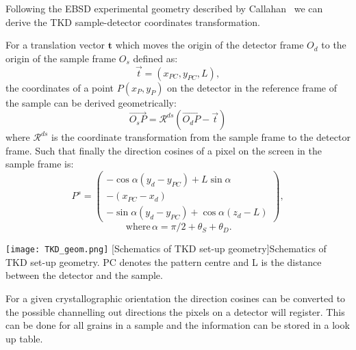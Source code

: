 Following the EBSD experimental geometry described by Callahan~\cite{degraef2013e} we can derive the TKD sample-detector coordinates transformation.


\noindent \begin{minipage}{0.5\textwidth}
\vspace{0.5cm}
For a translation vector $\textbf{t}$ which moves the origin of the detector frame $O_d$ to the origin of the sample frame $O_s$ defined as:
\begin{equation*}
    \vec{t}=(x_{PC}, y_{PC}, L),
\end{equation*}
the coordinates of a point $P(x_P, y_P)$ on the detector in the reference frame of the sample can be derived geometrically:
\begin{equation*}
   \vec{O_sP} = \mathcal{R}^{ds}(\vec{O_dP} -\vec{t})
\end{equation*}
where   $\mathcal{R}^{ds}$    is the coordinate transformation from the sample frame to the detector frame. Such that finally the direction cosines of a pixel on the screen in the sample frame is:
\begin{equation*}
    P^s=\begin{pmatrix}
    -\cos{\alpha}(y_d-y_{PC}) + L \sin{\alpha}   \\
    -(x_{PC}-x_d)\\
    -\sin{\alpha}(y_d-y_{PC}) + \cos{\alpha}(z_d-L)  
    \end{pmatrix}, 
\end{equation*}
\begin{equation*}
     \, \text{where} \,\alpha =\pi/2 + \theta_S + \theta_D.   
\end{equation*}    
\end{minipage}
\begin{minipage}{0.5\textwidth}
    \centering
\texttt{[image: TKD\_geom.png]}
[Schematics of TKD set-up geometry]{Schematics of TKD set-up geometry. PC denotes the pattern centre and L is the distance between the detector and the sample.} 
\label{fig:TKDgeometry}
\end{minipage}

\vspace{0.3cm}


For a given crystallographic orientation the direction cosines can be converted to the possible channelling out directions the pixels on a detector will register. This can be done for all grains in a sample and the information  can be stored in a look up table.







